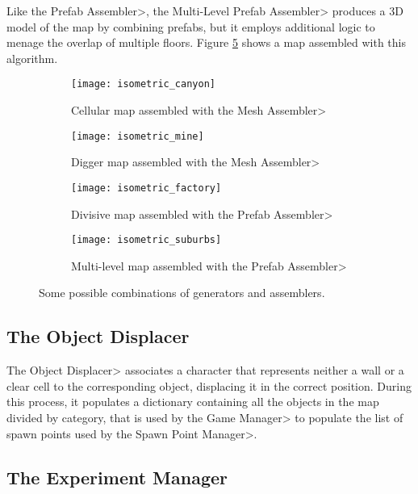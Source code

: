 Like the \<Prefab Assembler>, the \<Multi-Level Prefab Assembler> produces a 3D model of the map by combining prefabs, but it employs additional logic to menage the overlap of multiple floors. Figure \ref{fig:multi_assembled} shows a map assembled with this algorithm.

\begin{figure}
\centering
\begin{subfigure}[t]{0.48\linewidth}
\texttt{[image: isometric\_canyon]}
\caption{Cellular map assembled with the \<Mesh Assembler>}
\label{fig:cellular_assembled}
\end{subfigure}
\begin{subfigure}[t]{0.48\linewidth}
\texttt{[image: isometric\_mine]}
\caption{Digger map assembled with the \<Mesh Assembler>}
\label{fig:digger_assembled}
\end{subfigure}
\begin{subfigure}[t]{0.48\linewidth}
\texttt{[image: isometric\_factory]}
\caption{Divisive map assembled with the \<Prefab Assembler>}
\label{fig:divisive_assembled}
\end{subfigure}
\begin{subfigure}[t]{0.48\linewidth}
\texttt{[image: isometric\_suburbs]}
\caption{Multi-level map assembled with the \<Prefab Assembler>}
\label{fig:multi_assembled}
\end{subfigure}
\caption{Some possible combinations of generators and assemblers.}
\end{figure}


\subsection{The Object Displacer}

The \<Object Displacer> associates a character that represents neither a wall or a clear cell to the corresponding object, displacing it in the correct position. During this process, it populates a dictionary containing all the objects in the map divided by category, that is used by the \<Game Manager> to populate the list of spawn points used by the \<Spawn Point Manager>.


\subsection{The Experiment Manager}

